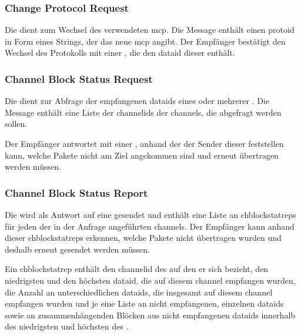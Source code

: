 \bmcpackbytefield


\subsubsection*{Change Protocol Request}
\label{dcl-bmcp-chprotoreq}
Die \msg{\bmcpchprotoreq} dient zum Wechsel des verwendeten \gls{mcp}.
Die Message enthält einen \gls{protoid} in Form eines Strings, der das neue
\gls{mcp} angibt.
Der Empfänger bestätigt den Wechsel des Protokolls mit einer \msg{\bmcpack},
die den \gls{dataid} dieser \msg{\bmcpchprotoreq} enthält.

\bmcpchprotoreqbytefield


\subsubsection*{Channel Block Status Request}
\label{dcl-bmcp-chblockstatreq}
Die \msg{\bmcpchblockstatreq} dient zur Abfrage der empfangenen \glspl{dataid}
eines oder mehrerer .
Die Message enthält eine Liste der \glspl{channelid} der \glspl{channel}, die
abgefragt werden sollen.

Der Empfänger antwortet mit einer \msg{\bmcpchblockstatrep}, anhand der der
Sender dieser \msg{\bmcpchblockstatreq} feststellen kann, welche Pakete nicht
am Ziel angekommen sind und erneut übertragen werden müssen.



\subsubsection*{Channel Block Status Report}
\label{dcl-bmcp-chblockstatrep}
Die \msg{\bmcpchblockstatrep} wird als Antwort auf eine
\msg{\bmcpchblockstatreq} gesendet und enthält eine Liste an
\glspl{chblockstatrep} für jeden der in der Anfrage angeführten \glspl{channel}.
Der Empfänger kann anhand dieser \glspl{chblockstatrep} erkennen, welche Pakete
nicht übertragen wurden und deshalb erneut gesendet werden müssen.

Ein \gls{chblockstatrep} enthält den \gls{channelid} des
 auf den er sich bezieht,
den niedrigsten und den höchsten \gls{dataid}, die auf diesem \gls{channel}
empfangen wurden, %
die Anzahl an unterschiedlichen \glspl{dataid}, die insgesamt auf diesem
\gls{channel} empfangen wurden
und je eine Liste an nicht empfangenen, einzelnen \glspl{dataid} sowie an
zusammenhängenden Blöcken aus nicht empfangenen \glspl{dataid} innerhalb des
niedrigsten und höchsten  des
.

